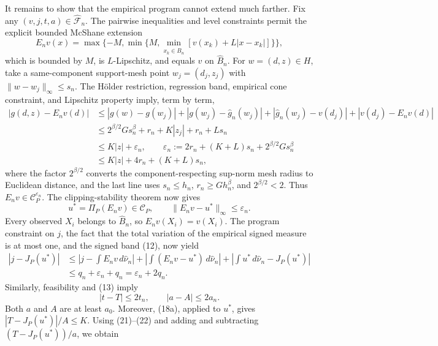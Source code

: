 It remains to show that the empirical program cannot extend much farther.  Fix any \((v,j,t,a)\in\widehat{\mathscr F}_n\).  The pairwise inequalities and level constraints permit the explicit bounded McShane extension
\[
 E_nv(x)=\max\{-M,\min\{M,\min_{x_k\in\widehat B_n}[v(x_k)+L|x-x_k|]\}\},
\]
which is bounded by \(M\), is \(L\)-Lipschitz, and equals \(v\) on \(\widehat B_n\).  For \(w=(d,z)\in H\), take a same-component support-mesh point \(w_j=(d_j,z_j)\) with \(\|w-w_j\|_\infty\le s_n\).  The H\"older restriction, regression band, empirical cone constraint, and Lipschitz property imply, term by term,
\[
\begin{aligned}
 |g(d,z)-E_nv(d)|
 &\le |g(w)-g(w_j)|+|g(w_j)-\widehat g_n(w_j)|
      +|\widehat g_n(w_j)-v(d_j)|+|v(d_j)-E_nv(d)|\\
 &\le 2^{\beta/2}Gs_n^\beta+r_n+K|z_j|+r_n+Ls_n\\
 &\le K|z|+\varepsilon_n,
 \qquad
 \varepsilon_n:=2r_n+(K+L)s_n+2^{\beta/2}Gs_n^\beta\\
 &\le K|z|+4r_n+(K+L)s_n,
\end{aligned}                                                                     \tag{19}
\]
where the factor \(2^{\beta/2}\) converts the component-respecting sup-norm mesh radius to Euclidean distance, and the last line uses \(s_n\le h_n\), \(r_n\ge Gh_n^\beta\), and \(2^{\beta/2}<2\).  Thus \(E_nv\in\mathcal C_P^{\varepsilon_n}\).  The clipping-stability theorem now gives
\[
 u^*=\Pi_P(E_nv)\in\mathcal C_P,
 \qquad \|E_nv-u^*\|_\infty\le\varepsilon_n.                                  \tag{20}
\]
Every observed \(X_i\) belongs to \(\widehat B_n\), so \(E_nv(X_i)=v(X_i)\).  The program constraint on \(j\), the fact that the total variation of the empirical signed measure is at most one, and the signed band (12), now yield
\[
\begin{aligned}
 |j-J_P(u^*)|
 &\le \left|j-\int E_nv\,d\widehat\nu_n\right|
      +\left|\int(E_nv-u^*)\,d\widehat\nu_n\right|
      +\left|\int u^*\,d\widehat\nu_n-J_P(u^*)\right|\\
 &\le q_n+\varepsilon_n+q_n
 =\varepsilon_n+2q_n.                                                            \tag{21}
\end{aligned}
\]
Similarly, feasibility and (13) imply
\[
 |t-T|\le2t_n,
 \qquad |a-A|\le2a_n.                                                            \tag{22}
\]
Both \(a\) and \(A\) are at least \(a_0\).  Moreover, (18a), applied to \(u^*\), gives \(|T-J_P(u^*)|/A\le K\).  Using (21)--(22) and adding and subtracting \((T-J_P(u^*))/a\), we obtain
